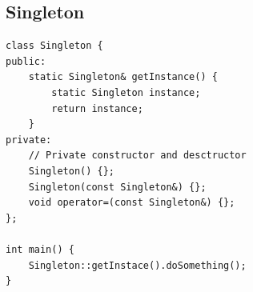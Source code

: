 \documentclass[resume]{subfiles}
\begin{document}
\subsection{Singleton}
\begin{lstlisting}[style=Cpp]
class Singleton {
public:
	static Singleton& getInstance() {
		static Singleton instance;
		return instance;
	}
private:
	// Private constructor and desctructor
	Singleton() {};
	Singleton(const Singleton&) {};
	void operator=(const Singleton&) {};
};

int main() {
	Singleton::getInstace().doSomething();
}
\end{lstlisting}
\end{document}
